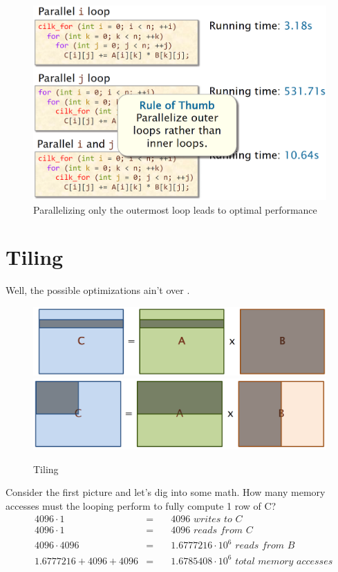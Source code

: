 \begin{figure}[htbp]
   \centering
   \includegraphics{images/02/loops_rule_of_thumb.png}
   \caption{Parallelizing only the outermost loop leads to optimal performance}
   \label{fig:02/loops_rule_of_thumb}
\end{figure}

\newpage
\section{Tiling}
Well, the possible optimizations ain't over \smiley.
\begin{figure}[htbp]
   \centering
   \includegraphics{images/02/tiling1.png}\\
   \includegraphics{images/02/tiling2.png}
   \caption{Tiling}
   \label{fig:02/tiling}
\end{figure}
Consider the first picture and let's dig into some math. How many memory accesses must the looping perform to fully compute 1 row of C? 
\begin{align}
   &4096 \cdot 1 &=\quad& 4096 \textit{ writes to C}\\
   &4096 \cdot 1 &=\quad& 4096 \textit{ reads from C}\\
   &4096 \cdot 4096 &=\quad& 1.6777216\cdot 10^6 \textit{ reads from B}\\
   &1.6777216 + 4096 + 4096 &=\quad& 1.6785408\cdot 10^6 \textit{ total memory accesses}
\end{align}

